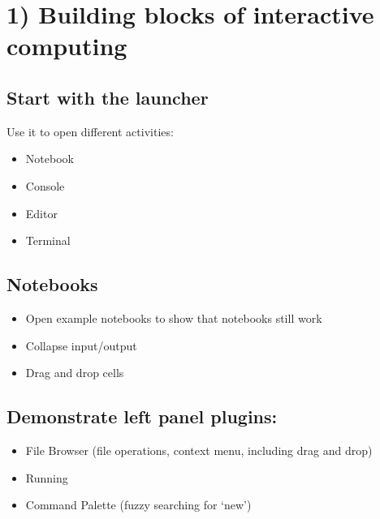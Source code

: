 \documentclass[letterpaper,10pt,english]{sphinxmanual}
\begin{document}
\section{1) Building blocks of interactive computing}
\label{\detokenize{markdown:building-blocks-of-interactive-computing}}

\subsection{Start with the launcher}
\label{\detokenize{markdown:start-with-the-launcher}}
Use it to open different activities:
\begin{itemize}
\item {} 
Notebook

\item {} 
Console

\item {} 
Editor

\item {} 
Terminal

\end{itemize}


\subsection{Notebooks}
\label{\detokenize{markdown:notebooks}}\begin{itemize}
\item {} 
Open example notebooks to show that notebooks still work

\item {} 
Collapse input/output

\item {} 
Drag and drop cells

\end{itemize}


\subsection{Demonstrate left panel plugins:}
\label{\detokenize{markdown:demonstrate-left-panel-plugins}}\begin{itemize}
\item {} 
File Browser (file operations, context menu, including drag and drop)

\item {} 
Running

\item {} 
Command Palette (fuzzy searching for ‘new’)

\end{itemize}
\end{document}
